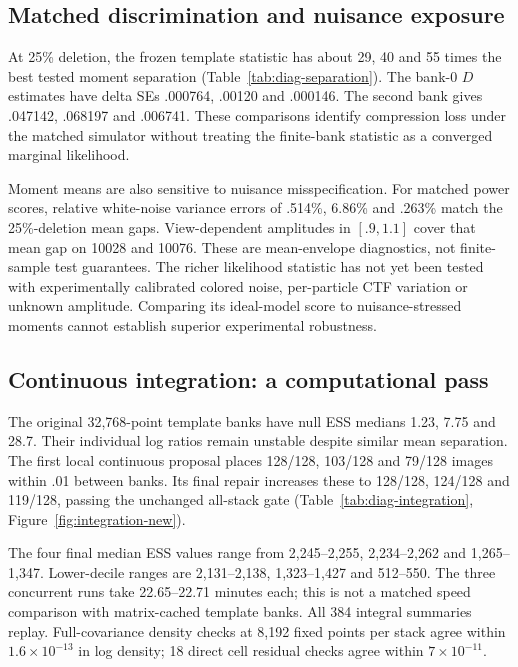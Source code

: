 \documentclass{article}
\begin{document}
\subsection{Matched discrimination and nuisance exposure}

At 25\% deletion, the frozen template statistic has about 29, 40 and 55
times the best tested moment separation (Table~\ref{tab:diag-separation}).
The bank-0 $D$ estimates have delta SEs .000764, .00120 and .000146.
The second bank gives .047142, .068197 and .006741. These comparisons
identify compression loss under the matched simulator without treating the
finite-bank statistic as a converged marginal likelihood.

Moment means are also sensitive to nuisance misspecification. For matched
power scores, relative white-noise variance errors of .514\%, 6.86\% and
.263\% match the 25\%-deletion mean gaps. View-dependent amplitudes in
$[.9,1.1]$ cover that mean gap on 10028 and 10076. These are mean-envelope
diagnostics, not finite-sample test guarantees. The richer likelihood
statistic has not yet been tested with experimentally calibrated colored
noise, per-particle CTF variation or unknown amplitude. Comparing its
ideal-model score to nuisance-stressed moments cannot establish superior
experimental robustness.

\subsection{Continuous integration: a computational pass}
The original 32,768-point template banks have null ESS medians 1.23, 7.75
and 28.7. Their individual log ratios remain unstable despite similar mean
separation. The first local continuous proposal places 128/128, 103/128 and
79/128 images within .01 between banks. Its final repair increases these
to 128/128, 124/128 and 119/128, passing the unchanged all-stack gate
(Table~\ref{tab:diag-integration}, Figure~\ref{fig:integration-new}).


The four final median ESS values range from 2,245--2,255, 2,234--2,262 and
1,265--1,347. Lower-decile ranges are 2,131--2,138, 1,323--1,427 and
512--550. The three concurrent runs take 22.65--22.71 minutes each; this is
not a matched speed comparison with matrix-cached template banks.
All 384 integral summaries replay. Full-covariance density checks at 8,192
fixed points per stack agree within $1.6\times10^{-13}$ in log density;
18 direct cell residual checks agree within $7\times10^{-11}$.
\end{document}
